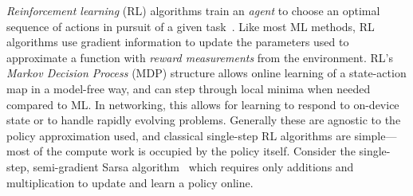 \documentclass[sigconf,natbib=false]{acmart}
\newcommand{\acval}[3]{\ensuremath{\operatorname{\hat{q}}(#1, #2, #3)}}
\newcommand{\acvalblank}{\ensuremath{\operatorname{\hat{q}}(\cdot)}}
\newcommand{\wvec}[1]{\ensuremath{\bm{w}_{#1}}}
\begin{document}
\emph{Reinforcement learning} (RL) algorithms train an \emph{agent} to choose an optimal sequence of actions in pursuit of a given task~\parencite{RL2E}.
Like most ML methods, RL algorithms use gradient information to update the parameters used to approximate a function with \emph{reward measurements} from the environment.
RL's \emph{Markov Decision Process} (MDP) structure allows online learning of a state-action map in a model-free way, and can step through local minima when needed compared to ML.
In networking, this allows for learning to respond to on-device state or to handle rapidly evolving problems.
Generally these are agnostic to the policy approximation used, and classical single-step RL algorithms are simple---most of the compute work is occupied by the policy itself.
Consider the single-step, semi-gradient Sarsa algorithm~\cite[pp. \numrange{217}{221}]{RL2E} which requires only additions and multiplication to update and learn a policy online.

\end{document}

